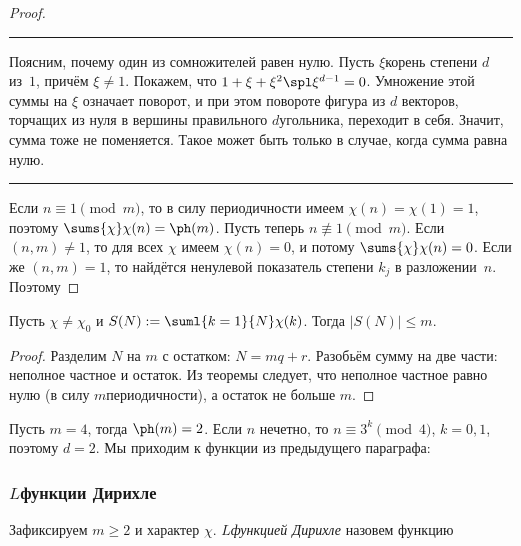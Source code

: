 \documentclass[a4paper]{article}
\def\nequiv{\not\equiv}
\newenvironment{petit}
{\par\smallskip\hrule\smallskip\footnotesize}{\par\smallskip\hrule\smallskip}
\begin{document}
\begin{proof}
\begin{petit}
Поясним, почему один из сомножителей равен нулю. Пусть $\xi$\т корень степени $d$ из~$1$,
причём $\xi \neq 1$. Покажем, что $1 + \xi + \xi^2\spl \xi^{d-1} = 0$. Умножение этой суммы на $\xi$ означает поворот,
и при этом повороте фигура из $d$ векторов, торчащих из нуля в вершины правильного $d$\д угольника, переходит в себя.
Значит, сумма тоже не поменяется. Такое может быть только в случае, когда сумма равна нулю.
\end{petit}

 Если $n\equiv1\pmod{m}$, то в силу периодичности имеем $\chi(n)=\chi(1)=1$, поэтому $\sums{\chi}\chi(n)=\ph(m)$. Пусть теперь
$n\nequiv1 \pmod{m}$. Если $(n,m)\neq1$, то для всех $\chi$ имеем $\chi(n)=0$, и потому $\sums{\chi}\chi(n)=0$.
Если же $(n,m)=1$, то найдётся ненулевой показатель степени $k_j$ в разложении~$n$. Поэтому
\hfill\end{proof}

\begin{imp}
Пусть $\chi\neq \chi_0$ и $S(N):=\suml{k=1}{N}\chi(k)$. Тогда $|S(N)|\le m$.
\end{imp}
\begin{proof}
Разделим $N$ на $m$ с остатком: $N = mq+r$. Разобьём сумму на две части: неполное частное и остаток.
Из теоремы следует, что неполное частное равно нулю (в силу $m$\д периодичности), а остаток не больше $m$.
\end{proof}
\begin{ex}
Пусть $m=4$, тогда $\ph(m)=2$. Если $n$ нечетно, то $n\equiv3^k\pmod{4}$, $k=0,1$, поэтому $d=2$.
Мы приходим к функции из предыдущего параграфа:
\end{ex}

\subsubsection{$L$\д функции Дирихле}

\begin{df}
Зафиксируем $m\ge2$ и характер $\chi$. \emph{$L$\д функцией Дирихле} назовем функцию
\end{df}
\end{document}
